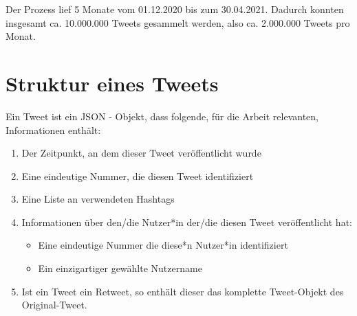 Der Prozess lief 5 Monate vom 01.12.2020 bis zum 30.04.2021. 
Dadurch konnten insgesamt ca. 10.000.000 Tweets gesammelt werden, also ca. 2.000.000 Tweets pro Monat.

\section{Struktur eines Tweets}
\label{sec:struktur-eines-tweets}
Ein Tweet ist ein \ac{JSON} - Objekt, dass folgende, für die Arbeit relevanten, Informationen enthält:
\begin{enumerate}
	\item Der Zeitpunkt, an dem dieser Tweet veröffentlicht wurde
	\item Eine eindeutige Nummer, die diesen Tweet identifiziert
	\item Eine Liste an verwendeten \glspl{Hashtag}
	\item Informationen über den/die Nutzer*in der/die diesen Tweet veröffentlicht hat: 
	\begin{itemize}
		\item Eine eindeutige Nummer die diese*n Nutzer*in identifiziert
		\item Ein einzigartiger gewählte Nutzername
	\end{itemize}
	\item Ist ein Tweet ein \gls{Retweet}, so enthält dieser das komplette Tweet-Objekt des Original-Tweet.
\end{enumerate}



 